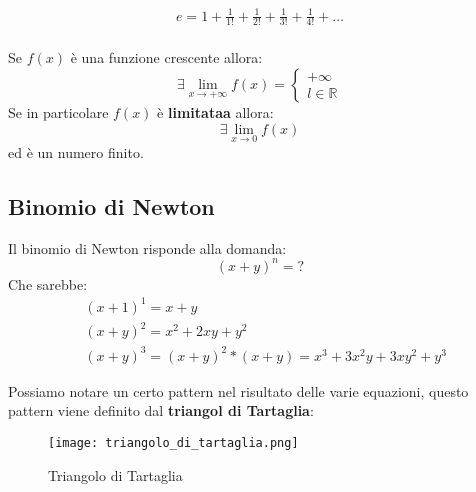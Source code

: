 \documentclass[../main.tex, class=article, 12pt]{subfiles}
\begin{document}
\begin{align*}
        e = 1  +\frac{1}{1!} +\frac{1}{2!} +\frac{1}{3!}+\frac{1}{4!}+\ldots \\
\end{align*}

\begin{theorem}
       Se $ f(x) $ è una funzione crescente allora:
       \begin{equation*}
               \exists \lim_{x \to +\infty}f(x)= \begin{cases}+\infty \\ l \in \mathbb{R}\end{cases}
       \end{equation*}
       Se in particolare $ f(x) $ è \textbf{limitataa} allora:
       \begin{equation*}
               \exists \lim_{x \to 0} f(x) 
       \end{equation*}
       ed è un numero finito.
\end{theorem}


\subsection{Binomio di Newton}\label{sec:binomio_di_newton}
\begin{definition}
        Il binomio di Newton risponde alla domanda:
        \begin{equation*}
                {(x + y)}^n = ?  
        \end{equation*}
        Che sarebbe:
        \begin{align*}
                & {(x+1)}^1 = x + y \\
                & {(x+y)}^2 = x^2 + 2xy + y^2 \\
                & {(x+y)}^3 = {(x+y)}^2 * (x + y) = x^3 + 3x^2y+3xy^2+y^3 
        \end{align*}
\end{definition}

Possiamo notare un certo pattern nel risultato delle varie equazioni, questo pattern viene definito dal \textbf{triangol di Tartaglia}:
\begin{figure}[H]
  	\texttt{[image: triangolo\_di\_tartaglia.png]}
  	\caption{Triangolo di Tartaglia}
        \label{fig:triangolo_di_tartaglia.png}
\end{figure}
\end{document}
